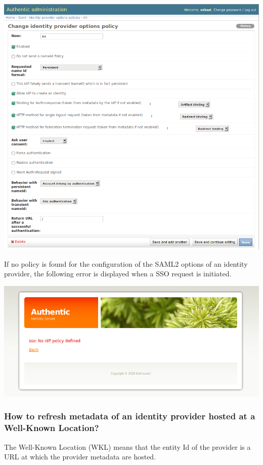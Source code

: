 \documentclass[letterpaper,10pt,english]{sphinxmanual}
\begin{document}
\includegraphics{sp_options_all.png}

If no policy is found for the configuration of the SAML2 options of an identity
provider, the following error is displayed when a SSO request is initiated.

\includegraphics{error_no_idp_options.png}


\subsubsection{How to refresh metadata of an identity provider hosted at a Well-Known Location?}
\label{config_saml2_idp:how-to-refresh-metadata-of-an-identity-provider-hosted-at-a-well-known-location}
The Well-Known Location (WKL) means that the entity Id of the provider is a
URL at which the provider metadata are hosted.
\end{document}

